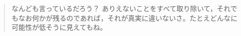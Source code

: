 \begin{quote}
	なんども言っているだろう？ ありえないことをすべて取り除いて，それでもなお何かが残るのであれば，それが真実に違いないさ。たとえどんなに可能性が低そうに見えてもね。
\end{quote}
